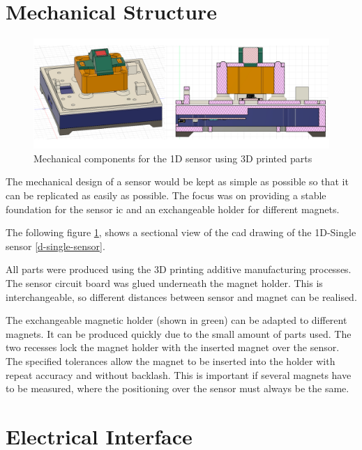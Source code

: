 \hypertarget{mechanical-structure}{%
\section{Mechanical Structure}\label{mechanical-structure}}

\begin{figure}
\centering
\includegraphics{./generated_images/border_Mechanical_components_for_the_1D_sensor_using_3D_printed_parts.png}
\caption{Mechanical components for the 1D sensor using 3D printed parts
\label{Mechanical_components_for_the_1D_sensor_using_3D_printed_parts.png}}
\end{figure}

The mechanical design of a sensor would be kept as simple as possible so
that it can be replicated as easily as possible. The focus was on
providing a stable foundation for the sensor \gls{ic} and an
exchangeable holder for different magnets.

The following figure
\ref{Mechanical_components_for_the_1D_sensor_using_3D_printed_parts.png},
shows a sectional view of the \gls{cad} drawing of the 1D-Single sensor
\ref{d-single-sensor}.

All parts were produced using the 3D printing additive manufacturing
processes. The sensor circuit board was glued underneath the magnet
holder. This is interchangeable, so different distances between sensor
and magnet can be realised.

The exchangeable magnetic holder (shown in green) can be adapted to
different magnets. It can be produced quickly due to the small amount of
parts used. The two recesses lock the magnet holder with the inserted
magnet over the sensor. The specified tolerances allow the magnet to be
inserted into the holder with repeat accuracy and without backlash. This
is important if several magnets have to be measured, where the
positioning over the sensor must always be the same.

\hypertarget{electrical-interface}{%
\section{Electrical Interface}\label{electrical-interface}}

